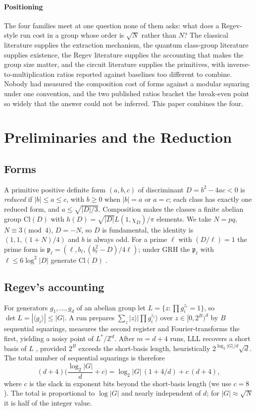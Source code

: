 \documentclass[runningheads]{llncs}
\newcommand{\Cl}{\mathrm{Cl}}
\newcommand{\Z}{\mathbb{Z}}
\newcommand{\p}{\mathfrak{p}}
\begin{document}
\paragraph{Positioning} The four families meet at one question none of them asks: what does a Regev-style run cost in a group whose order is $\sqrt N$ rather than $N$? The classical literature supplies the extraction mechanism, the quantum class-group literature supplies existence, the Regev literature supplies the accounting that makes the group size matter, and the circuit literature supplies the primitives, with inverse-to-multiplication ratios reported against baselines too different to combine. Nobody had measured the composition cost of forms against a modular squaring under one convention, and the two published ratios bracket the break-even point so widely that the answer could not be inferred. This paper combines the four.

\section{Preliminaries and the Reduction}\label{sec:prelim}
\subsection{Forms}
A primitive positive definite form $(a,b,c)$ of discriminant $D=b^2-4ac<0$ is \emph{reduced} if $|b|\le a\le c$, with $b\ge0$ when $|b|=a$ or $a=c$; each class has exactly one reduced form, and $a\le\sqrt{|D|/3}$. Composition makes the classes a finite abelian group $\Cl(D)$ with $h(D)=\sqrt{|D|}L(1,\chi_D)/\pi$ elements. We take $N=pq$, $N\equiv3\pmod4$, $D=-N$, so $D$ is fundamental, the identity is $(1,1,(1+N)/4)$ and $b$ is always odd. For a prime $\ell$ with $(D/\ell)=1$ the prime form is $\p_\ell=(\ell,b_\ell,(b_\ell^2-D)/4\ell)$; under GRH the $\p_\ell$ with $\ell\le6\log^2|D|$ generate $\Cl(D)$ \cite{bach1990}.

\subsection{Regev's accounting}
For generators $g_1,\dots,g_d$ of an abelian group let $L=\{z:\prod g_i^{z_i}=1\}$, so $\det L=|\langle g_i\rangle|\le|G|$. A run prepares $\sum_z|z\rangle|\prod g_i^{z_i}\rangle$ over $z\in[0,2^B)^d$ by $B$ sequential squarings, measures the second register and Fourier-transforms the first, yielding a noisy point of $L^*/\Z^d$. After $m=d+4$ runs, LLL recovers a short basis of $L$ \cite{regev2023}, provided $2^B$ exceeds the short-basis length, heuristically $2^{\log_2|G|/d}\sqrt d$. The total number of sequential squarings is therefore
\begin{equation}\label{eq:total}
(d+4)\Big(\frac{\log_2|G|}{d}+c\Big)=\log_2|G|\,(1+4/d)+c\,(d+4),
\end{equation}
where $c$ is the slack in exponent bits beyond the short-basis length (we use $c=8$). The total is proportional to $\log|G|$ and nearly independent of $d$; for $|G|\approx\sqrt N$ it is half of the integer value.
\end{document}
